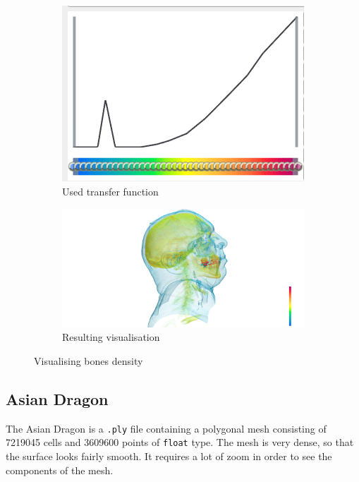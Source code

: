 \documentclass[openany]{article}
\begin{document}
\begin{figure}[h]
	\centering
	\begin{subfigure}{.4\textwidth}
		\centering
		\includegraphics[width=\linewidth]{VisHuman_Head/transfer_function_2}
		\caption{Used transfer function}
	\end{subfigure}%
	\begin{subfigure}{.6\textwidth}
		\centering
		\includegraphics[width=\linewidth]{VisHuman_Head/human_head_2}
		\caption{Resulting visualisation}
	\end{subfigure}
	\caption{Visualising bones density}
\end{figure}

\subsection {Asian Dragon}

The Asian Dragon is a \texttt{.ply} file containing a polygonal mesh consisting of 7219045 cells and 3609600 points of \texttt{float} type. The mesh is very dense, so that the surface looks fairly smooth. It requires a lot of zoom in order to see the components of the mesh.
\end{document}

